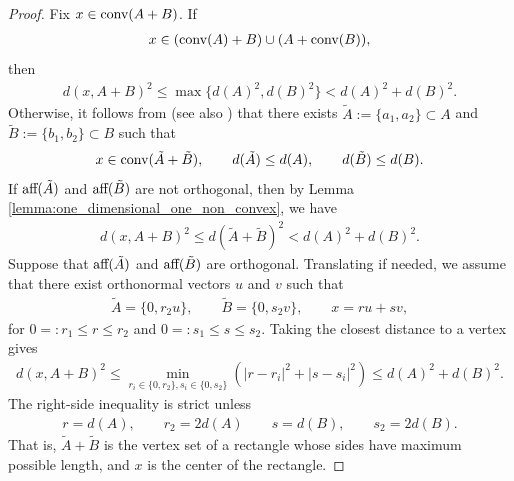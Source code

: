 \documentclass[11pt]{article}
\begin{document}
\begin{proof}
    Fix $x\in \textup{conv}(A+B)$. If
    \begin{align*}
        x\in (\textup{conv}(A)+B)\cup (A+\textup{conv}(B)),
    \end{align*}
    then 
    \begin{align*}
        d(x,A+B)^2\leq \max\{d(A)^2,d(B)^2\}<d(A)^2+d(B)^2.
    \end{align*}
    Otherwise, it follows from \cite[Lemma 3.8]{meyer2} (see also \cite{M-2026}) that there exists $\tilde{A}:=\{a_1,a_2\}\subset A$ and $\tilde{B}:=\{b_1,b_2\}\subset B$ such that 
    \begin{align*}
        x\in \textup{conv}(\tilde{A}+\tilde{B}),\qquad d(\tilde{A})\leq d(A),\qquad d(\tilde{B})\leq d(B).
    \end{align*}
    If $\textup{aff}(\tilde{A})$ and $\textup{aff}(\tilde{B})$ are not orthogonal, then by Lemma \ref{lemma:one_dimensional_one_non_convex}, we have
    \begin{align*}
        d(x,A+B)^2\leq d(\tilde{A}+\tilde{B})^2<d(A)^2+d(B)^2.
    \end{align*}
    Suppose that $\textup{aff}(\tilde{A})$ and $\textup{aff}(\tilde{B})$ are orthogonal. Translating if needed, we assume that there exist orthonormal vectors $u$ and $v$ such that 
    \begin{align*}
        \tilde{A}=\{0,r_2u\},\qquad \tilde{B}=\{0,s_2v\},\qquad x=ru+sv,
    \end{align*}
    for $0=:r_1\leq r\leq r_2$ and $0=:s_1\leq s\leq s_2$. Taking the closest distance to a vertex gives
    \begin{align*}
        d(x,A+B)^2\leq \min_{r_i\in \{0,r_2\},s_i\in\{0,s_2\}}(|r-r_i|^2+|s-s_i|^2)\leq d(A)^2+d(B)^2.
    \end{align*}
    The right-side inequality is strict unless
    \begin{align*}
        r=d(A),\qquad r_2=2d(A)\qquad s=d(B),\qquad s_2=2d(B). 
    \end{align*}
    That is, $\tilde{A}+\tilde{B}$ is the vertex set of a rectangle whose sides have maximum possible length, and $x$ is the center of the rectangle.


\end{proof}
\end{document}

